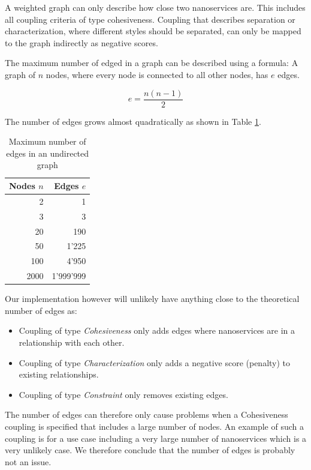 A weighted graph can only describe how close two nanoservices are. This includes all coupling criteria of type cohesiveness. Coupling that describes separation or characterization, where different styles should be separated, can only be mapped to the graph indirectly as negative scores. %

The maximum number of edged in a graph can be described using a formula: A graph of $n$ nodes, where every node is connected to all other nodes, has $e$ edges.

\begin{displaymath}
e = \frac{n(n-1)}{2}
\end{displaymath}

The number of edges grows almost quadratically as shown in Table \ref{tab:edgesCount}.

\begin{table}[H]
	\centering
	\caption{Maximum number of edges in an undirected graph}
	\label{tab:edgesCount}
	\begin{tabular}{|r|r|}
	\hline \textbf{Nodes} $n$ & \textbf{Edges} $e$ \\ 
	\hline 2 & 1 \\ 
	\hline 3 & 3 \\ 
	\hline 20 & 190 \\ 
	\hline 50 & 1'225 \\ 
	\hline 100 & 4'950 \\ 
	\hline 2000 & 1'999'999 \\ 
	\hline 
	\end{tabular} 
\end{table}

Our implementation however will unlikely have anything close to the theoretical number of edges as:
\begin{itemize}
\item Coupling of type \textit{Cohesiveness} only adds edges where nanoservices are in a relationship with each other.
\item Coupling of type \textit{Characterization} only adds a negative score (penalty) to existing relationships.
\item Coupling of type \textit{Constraint} only removes existing edges.
\end{itemize}

The number of edges can therefore only cause problems when a Cohesiveness coupling is specified that includes a large number of nodes. An example of such a coupling is for a use case including a very large number of nanoservices which is a very unlikely case. We therefore conclude that the number of edges is probably not an issue.



